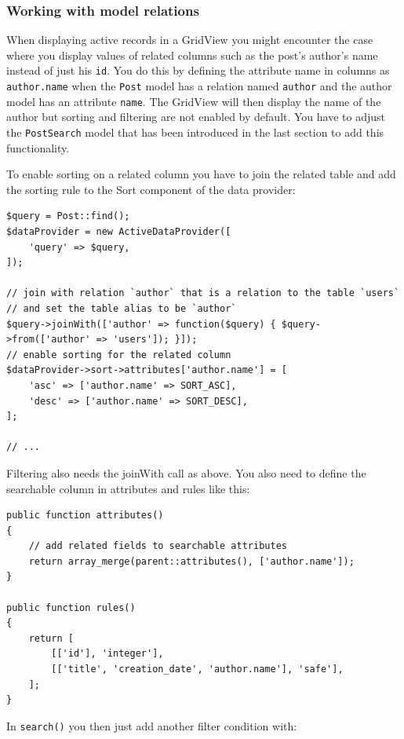 \subsubsection{Working with model relations}
When displaying active records in a GridView you might encounter the case where you display values of related
columns such as the post's author's name instead of just his \lstinline|id|.
You do this by defining the attribute name in columns as \lstinline|author.name| when the \lstinline|Post| model
has a relation named \lstinline|author| and the author model has an attribute \lstinline|name|.
The GridView will then display the name of the author but sorting and filtering are not enabled by default.
You have to adjust the \lstinline|PostSearch| model that has been introduced in the last section to add this functionality.

To enable sorting on a related column you have to join the related table and add the sorting rule
to the Sort component of the data provider:

\lstset{language=php}\begin{lstlisting}
$query = Post::find();
$dataProvider = new ActiveDataProvider([
    'query' => $query,
]);

// join with relation `author` that is a relation to the table `users`
// and set the table alias to be `author`
$query->joinWith(['author' => function($query) { $query->from(['author' => 'users']); }]);
// enable sorting for the related column
$dataProvider->sort->attributes['author.name'] = [
    'asc' => ['author.name' => SORT_ASC],
    'desc' => ['author.name' => SORT_DESC],
];

// ...
\end{lstlisting}
Filtering also needs the joinWith call as above. You also need to define the searchable column in attributes and rules like this:

\lstset{language=php}\begin{lstlisting}
public function attributes()
{
    // add related fields to searchable attributes
    return array_merge(parent::attributes(), ['author.name']);
}

public function rules()
{
    return [
        [['id'], 'integer'],
        [['title', 'creation_date', 'author.name'], 'safe'],
    ];
}
\end{lstlisting}
In \lstinline|search()| you then just add another filter condition with:

